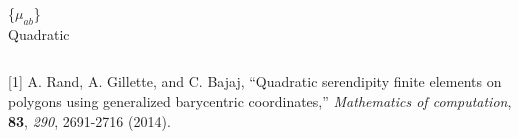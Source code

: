 \documentclass[compress,10pt]{beamer}
\begin{document}
\begin{frame}[t]
\begin{columns}[c]
{\{$\mu_{ab}$\} \\
Quadratic
}
\centering
{}
\end{columns}
\vspace{2mm}
\begin{block}{}{\footnotesize
[1] A. Rand, A. Gillette, and C. Bajaj, ``Quadratic serendipity finite elements on polygons using generalized barycentric coordinates,'' {\em Mathematics of computation}, {\bf 83}, {\em 290}, 2691-2716 (2014).
}\end{block}
\end{frame}
\end{document}
